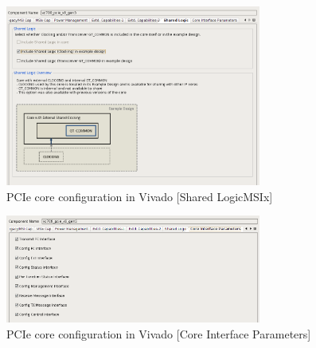 \begin{figure}[H]
\centering
\includegraphics[width=0.75\textwidth]{figures/pcie_core_shared.png}
\caption{PCIe core configuration in Vivado [Shared LogicMSIx]}
\label{fig:pcie_core_config10}
\end{figure}
\newpage
\begin{figure}[H]
\centering
\includegraphics[width=0.75\textwidth]{figures/pcie_core_coreintpar.png}
\caption{PCIe core configuration in Vivado [Core Interface Parameters]}
\label{fig:pcie_core_config11}
\end{figure}
\newpage